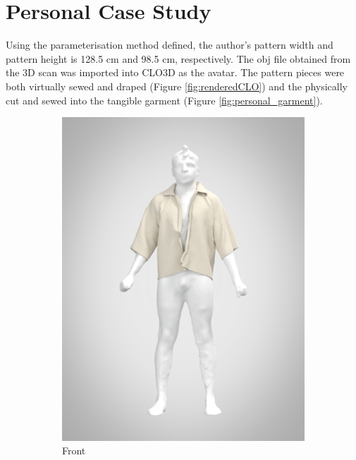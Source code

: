 \section{Personal Case Study}
Using the parameterisation method defined, the author's pattern width and pattern height is 128.5 cm and 98.5 cm, respectively. The obj file obtained from the 3D scan was imported into CLO3D as the avatar. The pattern pieces were both virtually sewed and draped (Figure \ref{fig:renderedCLO}) and the physically cut and sewed into the tangible garment (Figure \ref{fig:personal_garment}).

\begin{figure}[H]
    \centering
    \begin{subfigure}[b]{0.3\textwidth}
        \centering
        \includegraphics[width=\textwidth]{Images/renderfront.png}
        \caption{Front}
    \end{subfigure}
    \hfill
    \begin{subfigure}[b]{0.3\textwidth}

\end{subfigure}
\end{figure}
